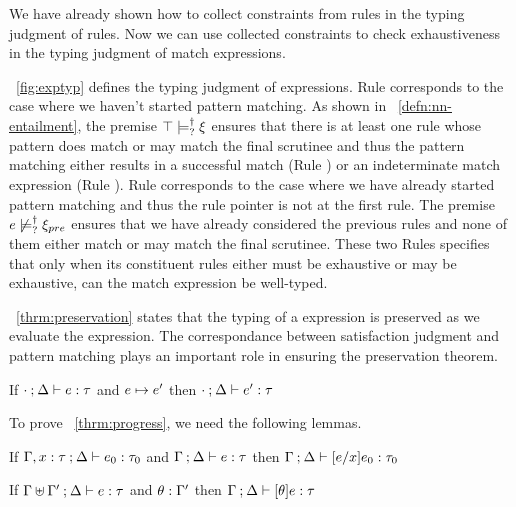 \documentclass[runningheads,envcountsame,a4paper]{llncs}
\begin{document}
We have already shown how to collect constraints from rules in the typing
judgment of rules. Now we can use collected constraints to check exhaustiveness
in the typing judgment of match expressions.



\figurename~\ref{fig:exptyp} defines the typing judgment of expressions. Rule
\TMatchZPre corresponds to the case where we haven't started pattern matching.
As shown in ~\ref{defn:nn-entailment}, the premise
$\top \models_{?}^{\dag} \xi$ ensures that there is at least one rule whose
pattern does match or may match the final scrutinee and thus the pattern
matching either results in a successful match (Rule \ITSuccMatch) or an
indeterminate match expression (Rule \IMatch). Rule \TMatchNZPre corresponds to
the case where we have already started pattern matching and thus the rule
pointer is not at the first rule. The premise $e \not\models_{?}^{\dag} \xi_{pre}$
ensures that we have already considered the previous rules and none of them
either match or may match the final scrutinee. These two Rules specifies that
only when its constituent rules either must be exhaustive or may be exhaustive,
can the match expression be well-typed.

\theoremname~\ref{thrm:preservation} states that the typing of a expression is
preserved as we evaluate the expression. The correspondance between satisfaction
judgment and pattern matching plays an important role in ensuring the
preservation theorem.
 
\begin{theorem}[Preservation]
  \label{thrm:preservation}
  If $\cdot \mathbin{;} \Delta \vdash e : \tau$ and $e \mapsto e'$
  then $\cdot \mathbin{;} \Delta \vdash e' : \tau$
\end{theorem}



To prove \theoremname~\ref{thrm:progress}, we need the following lemmas.
\begin{lemma}[Substitution]
  \label{lem:substitution}
  If $\Gamma, x : \tau \mathbin{;} \Delta \vdash e_0 : \tau_0$ and $\Gamma \mathbin{;} \Delta \vdash e : \tau$
  then $\Gamma \mathbin{;} \Delta \vdash [e/x]e_0 : \tau_0$
\end{lemma}

\begin{lemma}
  \label{lem:simult-substitution}
  If $\Gamma \uplus \Gamma' \mathbin{;} \Delta \vdash e : \tau$ and $\theta : \Gamma'$
  then $\Gamma \mathbin{;} \Delta \vdash [\theta]e : \tau$
\end{lemma}
\end{document}
